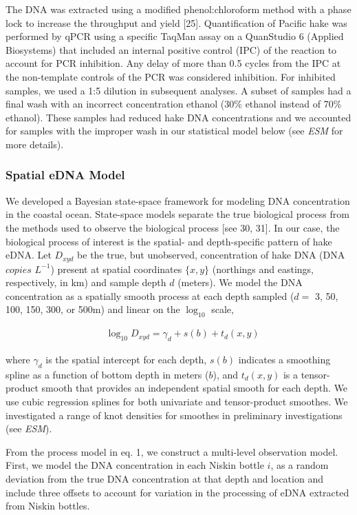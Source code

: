 \documentclass[
]{article}
\begin{document}
The DNA was extracted using a modified phenol:chloroform method with a
phase lock to increase the throughput and yield {[}25{]}. Quantification of
Pacific hake was performed by qPCR using a specific TaqMan assay on a
QuanStudio 6 (Applied Biosystems) that included an internal positive
control (IPC) of the reaction to account for PCR inhibition. Any delay of more 
than 0.5 cycles from the IPC at the non-template controls of the PCR was 
considered inhibition. For inhibited samples, we used a 1:5 dilution in subsequent analyses. 
A subset of samples had a final wash with an incorrect concentration ethanol (30\% ethanol instead of 70\% ethanol). These samples had reduced hake DNA concentrations and we accounted for samples with the improper wash in our statistical model below (see \emph{ESM} for more details).

\hypertarget{spatial-edna-model}{%
\subsubsection{Spatial eDNA Model}\label{spatial-edna-model}}

We developed a Bayesian state-space framework for modeling DNA
concentration in the coastal ocean. State-space models separate the true
biological process from the methods used to observe the biological process {[}see 30, 31{]}. 
In our case, the biological process of interest is the spatial- and depth-specific 
pattern of hake eDNA. Let \(D_{xyd}\) be the true, but
unobserved, concentration of hake DNA (DNA \(copies\) \(L^{-1}\)) present
at spatial coordinates \(\{x,y\}\) (northings and eastings,
respectively, in km) and sample depth \(d\) (meters). We model the DNA
concentration as a spatially smooth process at each depth sampled
(\(d =\) 3, 50, 100, 150, 300, or 500m) and linear on the \(\log_{10}\)
scale,

\begin{align}
  & \log_{10}D_{xyd}=\gamma_d + s(b) + t_d(x,y)
\end{align}

where \(\gamma_d\) is the spatial intercept for each depth, \(s(b)\)
indicates a smoothing spline as a function of bottom depth in meters
(\(b\)), and \(t_d(x,y)\) is a tensor-product smooth that provides an
independent spatial smooth for each depth. We use cubic regression
splines for both univariate and tensor-product smoothes. We investigated
a range of knot densities for smoothes in preliminary investigations (see \emph{ESM}).

From the process model in eq. 1, we construct a multi-level observation
model. First, we model the DNA concentration in each Niskin bottle
\(i\), as a random deviation from the true DNA concentration at that
depth and location and include three offsets to account for variation in
the processing of eDNA extracted from Niskin bottles. 
\end{document}
